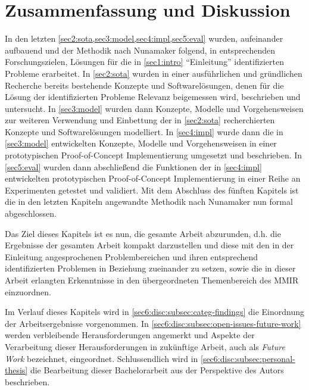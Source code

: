\section{Zusammenfassung und Diskussion}
\label{sec6:disc}
In den letzten {\cref{sec2:sota,sec3:model,sec4:impl,sec5:eval}} wurden, aufeinander aufbauend und der Methodik nach Nunamaker folgend, in entsprechenden Forschungszielen, Lösungen für die in \cref{sec1:intro} \enquote{Einleitung} identifizierten Probleme erarbeitet.
In \cref{sec2:sota} wurden in einer ausführlichen und gründlichen Recherche bereits bestehende Konzepte und Softwarelösungen, denen für die Lösung der identifizierten Probleme Relevanz beigemessen wird, beschrieben und untersucht.
In \cref{sec3:model} wurden dann Konzepte, Modelle und Vorgehensweisen zur weiteren Verwendung und Einbettung der in \cref{sec2:sota} recherchierten Konzepte und Softwarelösungen modelliert.
In \cref{sec4:impl} wurde dann die in \cref{sec3:model} entwickelten Konzepte, Modelle und Vorgehensweisen in einer prototypischen Proof-of-Concept Implementierung umgesetzt und beschrieben.
In \cref{sec5:eval} wurden dann abschließend die Funktionen der in \cref{sec4:impl} entwickelten prototypischen Proof-of-Concept Implementierung in einer Reihe an Experimenten getestet und validiert.
Mit dem Abschluss des fünften Kapitels ist die in den letzten Kapiteln angewandte Methodik nach Nunamaker nun formal abgeschlossen.


Das Ziel dieses Kapitels ist es nun, die gesamte Arbeit abzurunden, d.h. die Ergebnisse der gesamten Arbeit kompakt darzustellen und diese mit den in der Einleitung angesprochenen Problembereichen und ihren entsprechend identifizierten Problemen in Beziehung zueinander zu setzen, sowie die in dieser Arbeit erlangten Erkenntnisse in den übergeordneten Themenbereich des MMIR einzuordnen. %


Im Verlauf dieses Kapitels wird in \cref{sec6:disc:subsec:categ-findings} die Einordnung der Arbeitsergebnisse vorgenommen.
In \cref{sec6:disc:subsec:open-issues-future-work} werden verbleibende Herausforderungen angemerkt und Aspekte der Verarbeitung dieser Herausforderungen in zukünftige Arbeit, auch als \textit{Future Work} bezeichnet, eingeordnet.
Schlussendlich wird in \cref{sec6:disc:subsec:personal-thesis} die Bearbeitung dieser Bachelorarbeit aus der Perspektive des Autors beschrieben.

